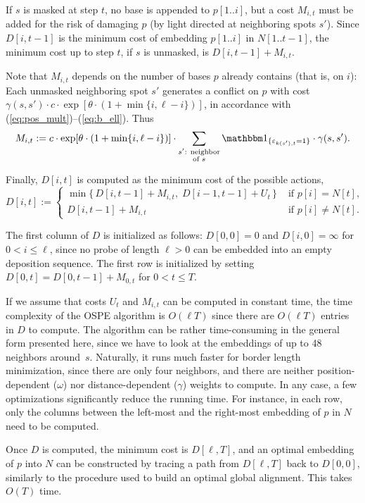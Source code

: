 If $s$ is masked at step $t$, no base is appended to $p[1..i]$, but a
cost $M_{i,t}$ must be added for the risk of damaging $p$ (by light
directed at neighboring spots $s'$). Since $D[i,t-1]$ is the minimum
cost of embedding $p[1..i]$ in $N[1..t-1]$, the minimum cost up to step
$t$, if $s$ is unmasked, is $D[i,t-1] + M_{i,t}$.

Note that $M_{i,t}$ depends on the number of bases $p$ already
contains (that is, on $i$): Each unmasked neighboring spot $s'$
generates a conflict on $p$ with cost $\gamma(s,s') \cdot c \cdot
\exp[\theta\cdot (1+\min\{i,\ell-i\})]$, in accordance with
(\ref{eq:pos_mult})--(\ref{eq:b_ell}). Thus
\[
M_{i,t} := c \cdot \exp[\theta\cdot (1+\min\{i,\ell-i\})] \cdot
\sum_{\substack{s'\text{: neighbor}\\\text{of } s}}
\Ind{\eps_{k(s'),t}=1}  \cdot \gamma(s,s').
\]

Finally, $D[i,t]$ is computed as the minimum cost of the possible
actions,
\[
D[i,t] := \begin{cases}
  \min \{\, D[i,t-1] + M_{i,t},\;  D[i-1,t-1] + U_t \,\}
  & \text{ if $p[i]=N[t]$,}\\
  D[i,t-1] + M_{i,t}
  & \text{ if $p[i]\neq N[t]$.}
  \end{cases}
\]

The first column of $D$ is initialized as follows: $D[0,0] = 0$ and
$D[i,0] = \infty$ for $0 < i \leq \ell$, since no probe of length
$\ell > 0$ can be embedded into an empty deposition sequence. The
first row is initialized by setting $D[0,t] = D[0,t-1]+M_{0,t}$ for
$0<t\leq T$.

If we assume that costs $U_t$ and $M_{i,t}$ can be computed in
constant time, the time complexity of the OSPE algorithm is $O(\ell
T)$ since there are $O(\ell T)$ entries in $D$ to compute. The algorithm can
be rather time-consuming in the general form presented here, since we
have to look at the embeddings of up to 48 neighbors around~$s$.
Naturally, it runs much faster for border length minimization, since
there are only four neighbors, and there are neither
position-dependent ($\omega$) nor distance-dependent ($\gamma$)
weights to compute. In any case, a few optimizations significantly
reduce the running time.  For instance, in each row, only the columns
between the left-most and the right-most embedding of $p$ in $N$ need
to be computed.

Once $D$ is computed, the minimum cost is $D[\ell,T]$, and an
optimal embedding of $p$ into $N$ can be constructed by tracing a path from
$D[\ell,T]$ back to $D[0,0]$, similarly to the procedure used to build an
optimal global alignment.  This takes $O(T)$ time.



